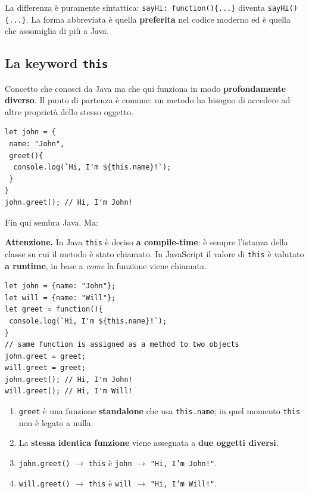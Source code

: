 \documentclass[10pt,a4paper]{article}
\newcommand{\avviso}[1]{\textbf{\textcolor{wamber}{Attenzione.}} #1}
\begin{document}
La differenza è puramente sintattica: \texttt{sayHi: function()\{...\}} diventa \texttt{sayHi()\{...\}}. La forma abbreviata è quella \textbf{preferita} nel codice moderno ed è quella che assomiglia di più a Java.

\subsection{La keyword \texttt{this}}

Concetto che conosci da Java ma che qui funziona in modo \textbf{profondamente diverso}. Il punto di partenza è comune: un metodo ha bisogno di accedere ad altre proprietà dello stesso oggetto.

\begin{lstlisting}[style=js]
let john = {
 name: "John",
 greet(){
  console.log(`Hi, I'm ${this.name}!`);
 }
}
john.greet(); // Hi, I'm John!
\end{lstlisting}

Fin qui sembra Java. Ma:

\begin{warnbox}
\avviso{In Java \texttt{this} è deciso \textbf{a compile-time}: è sempre l'istanza della classe su cui il metodo è stato chiamato. In JavaScript il valore di \texttt{this} è valutato \textbf{a runtime}, in base a \emph{come} la funzione viene chiamata.}
\end{warnbox}

\begin{lstlisting}[style=js]
let john = {name: "John"};
let will = {name: "Will"};
let greet = function(){
 console.log(`Hi, I'm ${this.name}!`);
}
// same function is assigned as a method to two objects
john.greet = greet;
will.greet = greet;
john.greet(); // Hi, I'm John!
will.greet(); // Hi, I'm Will!
\end{lstlisting}

\begin{enumerate}
  \item \texttt{greet} è una funzione \textbf{standalone} che usa \texttt{this.name}; in quel momento \texttt{this} non è legato a nulla.
  \item La \textbf{stessa identica funzione} viene assegnata a \textbf{due oggetti diversi}.
  \item \texttt{john.greet()} $\rightarrow$ \texttt{this} è \texttt{john} $\rightarrow$ \texttt{"Hi, I'm John!"}.
  \item \texttt{will.greet()} $\rightarrow$ \texttt{this} è \texttt{will} $\rightarrow$ \texttt{"Hi, I'm Will!"}.
\end{enumerate}
\end{document}
